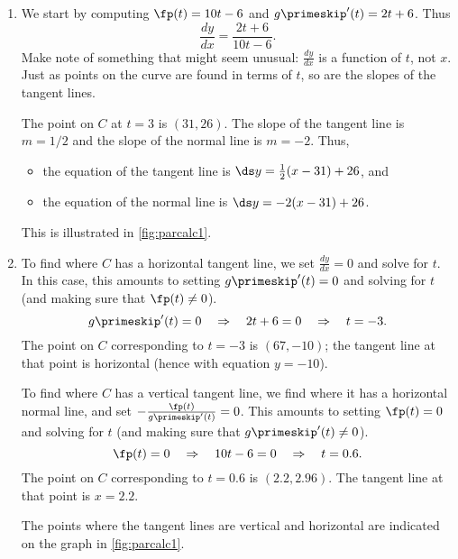 {\begin{enumerate}
	\item We start by computing $\fp(t) = 10t-6$ and $g\primeskip'(t) =2t+6$. Thus $$\frac{dy}{dx} = \frac{2t+6}{10t-6}.$$
	Make note of something that might seem unusual: $\frac{dy}{dx}$ is a function of $t$, not $x$. Just as points on the curve are found in terms of $t$, so are the slopes of the tangent lines.

	The point on $C$ at $t=3$ is $(31,26)$. The slope of the tangent line is $m=1/2$ and the slope of the normal line is $m=-2$. Thus,
	\begin{itemize}
		\item the equation of the tangent line is $\ds y=\frac12(x-31)+26$, and
		\item	the equation of the normal line is $\ds y=-2(x-31)+26$.
	\end{itemize}
	This is illustrated in \autoref{fig:parcalc1}.

	\item	To find where $C$ has a horizontal tangent line, we set $\frac{dy}{dx}=0$ and solve for $t$. In this case, this amounts to setting $g\primeskip'(t)=0$ and solving for $t$ (and making sure that $\fp(t)\neq 0$). 
	$$g\primeskip'(t)=0 \quad \Rightarrow \quad 2t+6=0 \quad \Rightarrow \quad t=-3.$$
	The point on $C$ corresponding to $t=-3$ is $(67,-10)$; the tangent line at that point is horizontal (hence with equation $y=-10$).
		
	To find where $C$ has a vertical tangent line, we find where it has a horizontal normal line, and set $-\frac{\fp(t)}{g\primeskip'(t)}=0$. This amounts to setting $\fp(t)=0$ and solving for $t$ (and making sure that $g\primeskip'(t)\neq 0$). 
	$$\fp(t)=0 \quad \Rightarrow \quad 10t-6=0 \quad \Rightarrow \quad t=0.6.$$
	The point on $C$ corresponding to $t=0.6$ is $(2.2,2.96)$. The tangent line at that point is $x=2.2$.
	
	The points where the tangent lines are vertical and horizontal are indicated on the graph in \autoref{fig:parcalc1}.\eoehere
\end{enumerate}}
	
